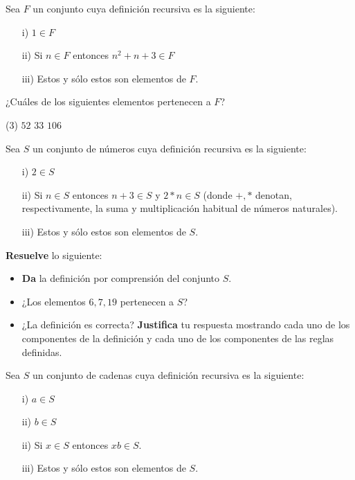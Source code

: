 \documentclass[oneside]{style}
\begin{document}
\begin{questions}[label=\protect\circled{\bfseries\arabic*}]

    \question
    {
        Sea $F$ un conjunto cuya definición recursiva es la siguiente:
        \begin{itemize}
            \item[i)] $1 \in F$
            \item[ii)] Si $n \in F$ entonces $n^2 + n + 3 \in F$
            \item[iii)] Estos y sólo estos son elementos de $F$.
        \end{itemize}   

        ¿Cuáles de los siguientes elementos pertenecen a $F$?
        \begin{tasks}(3)
            \task $52$
            \task $33$
            \task $106$
          \end{tasks}    
    }

    \question
    {
        Sea $S$ un conjunto de números cuya definición recursiva es 
        la siguiente:
        \begin{itemize}
            \item[i)] $2 \in S$
            \item[ii)] Si $n \in S$ entonces $n+3 \in S$ y $2*n \in S$
            (donde $+, *$ denotan, respectivamente, la suma y 
            multiplicación habitual de números naturales).
            \item[iii)] Estos y sólo estos son elementos de $S$.
        \end{itemize}   

        \textbf{Resuelve} lo siguiente:
        \begin{itemize}
            \item \textbf{Da} la definición por comprensión del conjunto 
            $S$.
            \item ¿Los elementos $6,7,19$ pertenecen a $S$?
            \item ¿La definición es correcta? \textbf{Justifica} tu respuesta 
            mostrando cada uno de los componentes de la definición y cada uno 
            de los componentes de las reglas definidas.  
        \end{itemize}
    }

    \question
    {
        Sea $S$ un conjunto de cadenas cuya definición recursiva es 
        la siguiente:
        \begin{itemize}
            \item[i)] $a \in S$
            \item[ii)] $b \in S$  
            \item[ii)] Si $x \in S$ entonces $xb \in S$.
            \item[iii)] Estos y sólo estos son elementos de $S$.
        \end{itemize}   

}
\end{questions}
\end{document}
